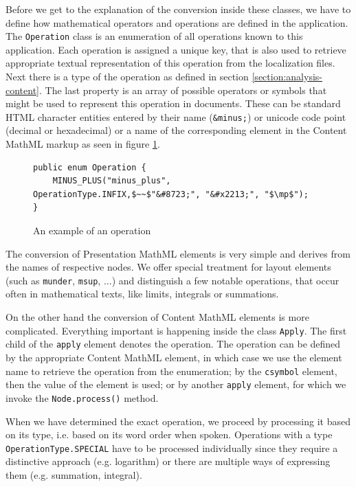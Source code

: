 \documentclass[11pt,oneside,final]{fithesis2}
\begin{document}
Before we get to the explanation of the conversion inside these classes, we have to define how mathematical operators and operations are defined in the application. The \texttt{Operation} class is an enumeration of all operations known to this application. Each operation is assigned a unique key, that is also used to retrieve appropriate textual representation of this operation from the localization files. Next there is a type of the operation as defined in section \ref{section:analysis-content}. The last property is an array of possible operators or symbols that might be used to represent this operation in documents. These can be standard HTML character entities entered by their name (\texttt{\&minus;}) or unicode code point (decimal or hexadecimal) or a name of the corresponding element in the Content MathML markup as seen in figure \ref{fig:converter-operation}.

\begin{figure}[!ht]
\begin{lstlisting}[mathescape=true]
public enum Operation {
	MINUS_PLUS("minus_plus", OperationType.INFIX,$~~$"&#8723;", "&#x2213;", "$\mp$");
}
\end{lstlisting}
\caption{An example of an operation}
\label{fig:converter-operation}
\end{figure}

The conversion of Presentation MathML elements is very simple and derives from the names of respective nodes. We offer special treatment for layout elements (such as \texttt{munder}, \texttt{msup}, $\ldots$) and distinguish a few notable operations, that occur often in mathematical texts, like limits, integrals or summations. 

On the other hand the conversion of Content MathML elements is more complicated. Everything important is happening inside the class \texttt{Apply}. The first child of the \texttt{apply} element denotes the operation. The operation can be defined by the appropriate Content MathML element, in which case we use the element name to retrieve the operation from the enumeration; by the \texttt{csymbol} element, then the value of the element is used; or by another \texttt{apply} element, for which we invoke the \texttt{Node.process()} method. 

When we have determined the exact operation, we proceed by processing it based on its type, i.e. based on its word order when spoken. Operations with a type \texttt{OperationType.SPECIAL} have to be processed individually since they require a distinctive approach (e.g. logarithm) or there are multiple ways of expressing them (e.g. summation, integral).
\end{document}
